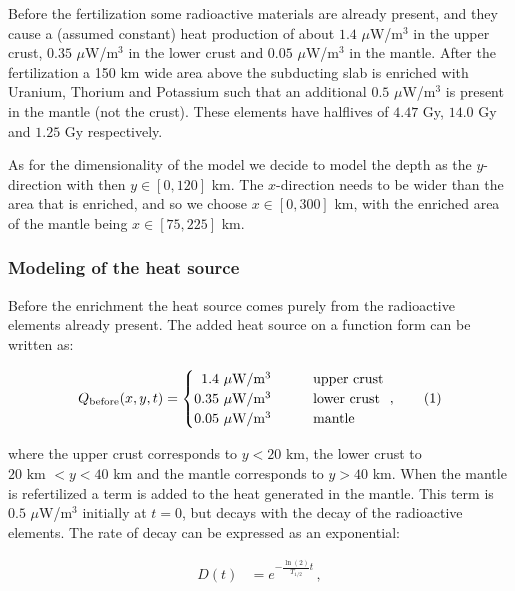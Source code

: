 \documentclass[reprint,english,notitlepage]{revtex4-1}  %
\newcommand\numberthis{\addtocounter{equation}{1}\tag{\theequation}}
\begin{document}
Before the fertilization some radioactive materials are already present, and they cause a (assumed constant) heat production of about $1.4$ $\mu$W/m$^3$ in the upper crust, $0.35$ $\mu$W/m$^3$ in the lower crust and $0.05$ $\mu$W/m$^3$ in the mantle. After the fertilization a 150 km wide area above the subducting slab is enriched with Uranium, Thorium and Potassium such that an additional $0.5$ $\mu$W/m$^3$ is present in the mantle (not the crust). These elements have halflives of $4.47$ Gy, $14.0$ Gy and $1.25$ Gy respectively.

As for the dimensionality of the model we decide to model the depth as the $y$-direction with then $y \in [0,120]$ km. The $x$-direction needs to be wider than the area that is enriched, and so we choose $x \in [0,300]$ km, with the enriched area of the mantle being $x \in [75,225]$ km. 


\subsubsection{Modeling of the heat source} \label{sec:formalism_heat_source_model}

Before the enrichment the heat source comes purely from the radioactive elements already present. The added heat source on a function form can be written as:

\begin{align*}
Q_\text{before}(x,y,t) = \begin{cases}
\,\,\, 1.4 \text{ $\mu$W/m$^3$} \quad  \quad  &\text{upper crust} \\
0.35 \text{ $\mu$W/m$^3$} \quad  \quad &\text{lower crust} \\
0.05 \text{ $\mu$W/m$^3$} \quad  \quad &\text{mantle}
\end{cases} \, , \numberthis \label{eq:unfertilized_heat}
\end{align*}

where the upper crust corresponds to $y<20$ km, the lower crust to $20 \text{ km } < y < 40$ km and the mantle corresponds to $y > 40$ km. When the mantle is refertilized a term is added to the heat generated in the mantle. This term is $0.5$ $\mu$W/m$^3$ initially at $t=0$, but decays with the decay of the radioactive elements. The rate of decay can be expressed as an exponential:

\begin{align*}
D(t) &= e^{-\frac{\ln(2)}{T_{1/2}} t} \, ,
\end{align*}
\end{document}
